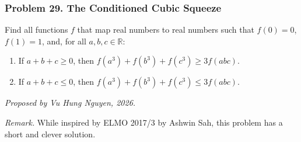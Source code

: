 \subsubsection*{Problem 29. The Conditioned Cubic Squeeze}

\begin{exercisebox}[hard]

Find all functions $f$ that map real numbers to real numbers such that
$f(0)=0$, $f(1)=1$, and, for all $a,b,c\in\mathbb R$:
\begin{enumerate}
    \item If $a+b+c\geq0$, then
          $f(a^3)+f(b^3)+f(c^3)\geq3f(abc)$.
    \item If $a+b+c\leq0$, then
          $f(a^3)+f(b^3)+f(c^3)\leq3f(abc)$.
\end{enumerate}

\begin{flushright}
\textit{Proposed by Vu Hung Nguyen, 2026.}
\end{flushright}

\textit{Remark.} While inspired by ELMO 2017/3 by Ashwin Sah, this problem has a short and clever solution.


\end{exercisebox}